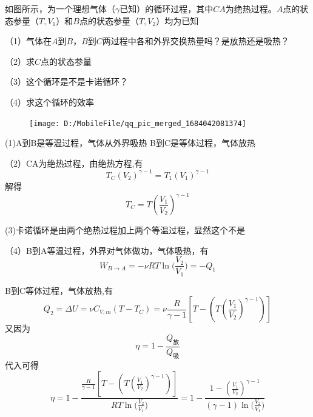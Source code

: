 \documentclass[lang=cn,10pt]{elegantbook}
\begin{document}
	\begin{example}
		如图所示，为一个理想气体（$\gamma$已知）的循环过程，其中$CA$为绝热过程。$A$点的状态参量（$T,V_{1}$）和$B$点的状态参量（$T,V_{2}$）均为已知
		
		（1）气体在$A$到$B$，$B$到$C$两过程中各和外界交换热量吗？是放热还是吸热？
		
		（2）求$C$点的状态参量
		
		（3）这个循环是不是卡诺循环？
		
		（4）求这个循环的效率
	\end{example}
	\begin{figure}[H]
		\centering
		\texttt{[image: D:/MobileFile/qq\_pic\_merged\_1684042081374]}
		\caption{}
		\label{fig:qqpicmerged1684042081374}
	\end{figure}
	\begin{solution}
		
		(1)A到B是等温过程，气体从外界吸热
		B到C是等体过程，气体放热
		
		（2）CA为绝热过程，由绝热方程,有
		\begin{equation*}
			T_C\left( V_2 \right) ^{\gamma -1}=T_1\left( V_1 \right) ^{\gamma -1}
		\end{equation*}
		解得
		\begin{equation*}
			T_{C}=T(\frac{V_{1}}{V_{2}})^{\gamma-1}
		\end{equation*}
		
		(3)卡诺循环是由两个绝热过程加上两个等温过程，显然这个不是
		
		（4）B到A等温过程，外界对气体做功，气体吸热，有
		\begin{equation*}
			W_{B\rightarrow A}=-\nu RT\ln\mathrm{(}\frac{V_2}{V_1})=-Q_{1}
		\end{equation*}
		
		B到C等体过程，气体放热,有
		\begin{equation*}
			Q_{2}=\varDelta U=\nu C_{V,m}(T-T_{C})=\nu \frac{R}{\gamma-1}[T-(T(\frac{V_{1}}{V_{2}})^{\gamma-1})]
		\end{equation*}
		又因为
		\begin{equation*}
			\eta=1-\frac{Q_{\text{放}}}{Q_{\text{吸}}}
		\end{equation*}
		代入可得
		\begin{equation*}
			\eta=1-\frac{ \frac{R}{\gamma-1}[T-(T(\frac{V_{1}}{V_{2}})^{\gamma-1})]}{ RT\ln\mathrm{(}\frac{V_2}{V_1})}=1-\dfrac{1-(\frac{V_{1}}{V_{2}})^{\gamma-1}}{(\gamma-1)\ln\mathrm{(}\frac{V_2}{V_1})}
		\end{equation*}
	\end{solution}
	
\end{document}
